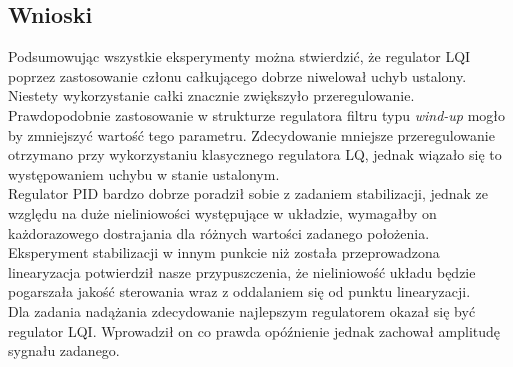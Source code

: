 \documentclass[11pt,a4paper]{article}
\begin{document}
\subsection{Wnioski}
Podsumowując wszystkie eksperymenty można stwierdzić, że regulator LQI poprzez zastosowanie członu całkującego dobrze niwelował uchyb ustalony. Niestety wykorzystanie całki znacznie zwiększyło przeregulowanie. Prawdopodobnie zastosowanie w strukturze regulatora filtru typu \textit{wind-up} mogło by zmniejszyć wartość tego parametru. Zdecydowanie mniejsze przeregulowanie otrzymano przy wykorzystaniu klasycznego regulatora LQ, jednak wiązało się to występowaniem uchybu w stanie ustalonym. \\
Regulator PID bardzo dobrze poradził sobie z zadaniem stabilizacji, jednak ze względu na duże nieliniowości występujące w układzie, wymagałby on każdorazowego dostrajania dla różnych wartości zadanego położenia. \\
Eksperyment stabilizacji w innym punkcie niż została przeprowadzona linearyzacja potwierdził nasze przypuszczenia, że nieliniowość układu będzie pogarszała jakość sterowania wraz z oddalaniem się od punktu linearyzacji.\\
Dla zadania nadążania zdecydowanie najlepszym regulatorem okazał się być regulator LQI. Wprowadził on co prawda opó\'znienie jednak zachował amplitudę sygnału zadanego.
\end{document}

